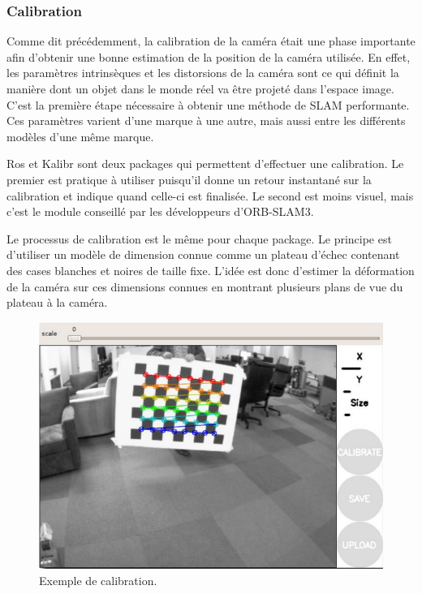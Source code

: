 \documentclass[11pt]{article}
\begin{document}
      \subsubsection{Calibration}
        Comme dit précédemment, la calibration de la caméra était une phase importante afin d'obtenir une bonne estimation de la position
        de la caméra utilisée. En effet, les paramètres intrinsèques et les distorsions de la caméra sont ce qui définit la manière dont 
        un objet dans le monde réel va être projeté dans l'espace image. C'est la première étape nécessaire à obtenir une méthode de 
        SLAM performante. Ces paramètres varient d'une marque à une autre, mais aussi entre les différents modèles d'une même marque.

        Ros et Kalibr sont deux packages qui permettent d'effectuer une calibration. Le premier est pratique à utiliser puisqu'il donne un 
        retour instantané sur la calibration et indique quand celle-ci est finalisée. Le second est moins visuel, mais c'est le module 
        conseillé par les développeurs d'ORB-SLAM3.

        Le processus de calibration est le même pour chaque package. Le principe est d'utiliser un modèle de dimension connue comme
        un plateau d'échec contenant des cases blanches et noires de taille fixe. L'idée est donc d'estimer la déformation de la caméra
        sur ces dimensions connues en montrant plusieurs plans de vue du plateau à la caméra.           

        \begin{figure}[hbt]  
          \includegraphics[width=\textwidth]{Calibration.png}    
          \caption{Exemple de calibration.}
          \label{fig:Calibration}
        \end{figure}
\end{document}
